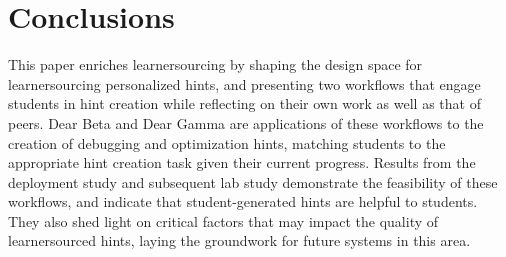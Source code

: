 
\section{Conclusions}
This paper enriches learnersourcing by shaping the design space for learnersourcing personalized hints, and presenting two workflows that engage students in hint creation while reflecting on their own work as well as that of peers. Dear Beta and Dear Gamma are applications of these workflows to the creation of debugging and optimization hints, matching students to the appropriate hint creation task given their current progress. Results from the deployment study and subsequent lab study demonstrate the feasibility of these workflows, and indicate that student-generated hints are helpful to students. They also shed light on critical factors that may impact the quality of learnersourced hints, laying the groundwork for future systems in this area.